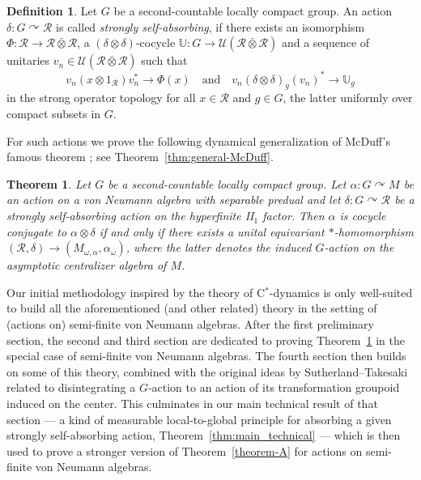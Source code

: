 \documentclass[11pt,a4paper]{article}
\newtheorem{theoremi}[theoremiCT]{Theorem}
\theoremstyle{definition}
\newtheorem{defii}[defiiCT]{Definition}
\theoremstyle{remark}
\numberwithin{equation}{section}
\numberwithin{theorem}{section}
\newcommand{\acts}{\curvearrowright}
\newcommand{\cstar}{C$^*$}
\begin{document}
\begin{defii}
Let $G$ be a second-countable locally compact group.
An action $\delta: G\curvearrowright\mathcal R$ is called \emph{strongly self-absorbing}, if there exists an isomorphism $\Phi: \mathcal R\to\mathcal R\bar{\otimes}\mathcal R$, a $(\delta\otimes\delta)$-cocycle $\mathbb{U}: G\to\mathcal{U}(\mathcal R\bar{\otimes}\mathcal R)$ and a sequence of unitaries $v_n\in\mathcal{U}(\mathcal R\bar{\otimes}\mathcal R)$ such that
\[
v_n(x\otimes 1_{\mathcal R})v_n^* \to \Phi(x) \quad\text{and}\quad v_n(\delta\otimes\delta)_g(v_n)^* \to \mathbb{U}_g
\]
in the strong operator topology for all $x\in\mathcal R$ and $g\in G$, the latter uniformly over compact subsets in $G$.
\end{defii}

For such actions we prove the following dynamical generalization of McDuff's famous theorem \cite{McDuff70}; see Theorem~\ref{thm:general-McDuff}.

\begin{theoremi} \label{theorem-C}
Let $G$ be a second-countable locally compact group.
Let $\alpha: G \acts M$ be an action on a von Neumann algebra with separable predual and let $\delta: G \acts \mathcal{R}$ be a strongly self-absorbing action on the hyperfinite II$_1$ factor.
Then $\alpha$ is cocycle conjugate to $\alpha\otimes\delta$ if and only if there exists a unital equivariant $*$-homomorphism $(\mathcal R,\delta) \to (M_{\omega,\alpha},\alpha_\omega)$, where the latter denotes the induced $G$-action on the asymptotic centralizer algebra of $M$.
\end{theoremi}

Our initial methodology inspired by the theory of \cstar-dynamics is only well-suited to build all the aforementioned (and other related) theory in the setting of (actions on) semi-finite von Neumann algebras.
After the first preliminary section, the second and third section are dedicated to proving Theorem~\ref{theorem-C} in the special case of semi-finite von Neumann algebras.
The fourth section then builds on some of this theory, combined with the original ideas by Sutherland--Takesaki \cite{SutherlandTakesaki85} related to disintegrating a $G$-action to an action of its transformation groupoid induced on the center. This culminates in our main technical result of that section --- a kind of measurable local-to-global principle for absorbing a given strongly self-absorbing action, Theorem~\ref{thm:main_technical} --- which is then used to prove a stronger version of Theorem~\ref{theorem-A} for actions on semi-finite von Neumann algebras. 
 
\end{document}
